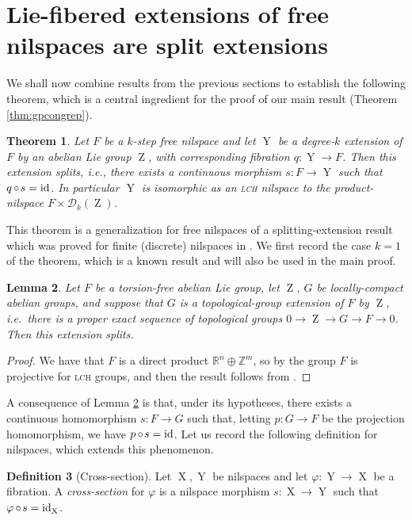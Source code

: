 \documentclass[a4paper,12pt,reqno]{amsart}
\newtheorem{theorem}{Theorem}[section]
\newtheorem{lemma}[theorem]{Lemma}
\theoremstyle{definition}
\newtheorem{defn}[theorem]{Definition}
\def\to{\rightarrow}
\newcommand{\mc}{\mathcal}
\newcommand{\mb}{\mathbb}
\newcommand{\id}{\mathrm{id}}
\DeclareMathOperator{\ab}{Z}
\DeclareMathOperator{\ns}{X}
\DeclareMathOperator{\nss}{Y}
\DeclareMathOperator{\co}{\circ\hspace{-0.02 cm}}
\begin{document}
\section{Lie-fibered extensions of free nilspaces are split extensions}\label{sec:split-ext}
We shall now combine results from the previous sections to establish the following theorem, which is a central ingredient for the proof of our main result (Theorem \ref{thm:gpcongrep}). 
\begin{theorem}\label{thm:splitext}
Let $F$ be a $k$-step free nilspace and let $\nss$ be a degree-$k$ extension of $F$ by an abelian Lie group $\ab$, with corresponding fibration $q:\nss\to F$. Then this  extension splits, i.e., there exists a continuous morphism $s:F\to\nss$ such that $q\co s=\id$. In particular $\nss$ is isomorphic as an \textsc{lch} nilspace to the product-nilspace $F\times \mc{D}_k(\ab)$.
\end{theorem}
\noindent This theorem is a generalization for free nilspaces of a splitting-extension result which was proved for finite (discrete) nilspaces in \cite[Theorem 5]{SzegFin}. We first record the case $k=1$ of the theorem, which is a known result and will also be used in the main proof.
\begin{lemma}\label{lem:abcasesplit}
Let $F$ be a torsion-free abelian Lie group, let $\ab$, $G$ be locally-compact abelian groups, and suppose that $G$ is a topological-group extension of $F$ by $\ab$, i.e.\ there is a proper exact sequence of topological groups $0\to \ab \to G \to F\to 0$. Then this extension splits.
\end{lemma}
\begin{proof}
We have that $F$ is a direct product $\mb{R}^n \oplus \mb{Z}^m$, so by \cite[Theorem 3.3]{Mosk} the group $F$ is projective for \textsc{lch} groups, and then the result follows from \cite[Theorem 3.5]{Mosk}.
\end{proof}

A consequence of Lemma \ref{lem:abcasesplit} is that, under its hypotheses, there exists a continuous homomorphism $s:F\to G$ such that, letting $p:G\to F$ be the projection homomorphism, we have $p\co s=\id$. Let us record the following definition for nilspaces, which extends this phenomenon.

\begin{defn}[Cross-section]
Let $\ns,\nss$ be nilspaces and let $\varphi:\nss\to \ns$ be a fibration. A \emph{cross-section} for $\varphi$ is a nilspace morphism $s:\ns\to \nss$ such that $\varphi\co s =\id_{\ns}$.
\end{defn}
\end{document}
